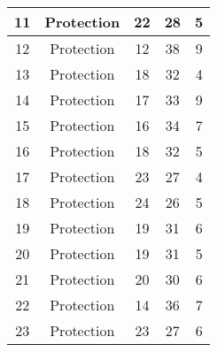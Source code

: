 \documentclass[results.tex]{subfiles}
\begin{document}
\begin{center}
\begin{tabular}{| c || c | c | c | c |}
            \hline
            11                      & Protection                   & 22                     & 28                      & 5                    \\
            \hline
            12                      & Protection                   & 12                     & 38                      & 9                    \\
            \hline
            13                      & Protection                   & 18                     & 32                      & 4                    \\
            \hline
            14                      & Protection                   & 17                     & 33                      & 9                    \\
            \hline
            15                      & Protection                   & 16                     & 34                      & 7                    \\
            \hline
            16                      & Protection                   & 18                     & 32                      & 5                    \\
            \hline
            17                      & Protection                   & 23                     & 27                      & 4                    \\
            \hline
            18                      & Protection                   & 24                     & 26                      & 5                    \\
            \hline
            19                      & Protection                   & 19                     & 31                      & 6                    \\
            \hline
            20                      & Protection                   & 19                     & 31                      & 5                    \\
            \hline
            21                      & Protection                   & 20                     & 30                      & 6                    \\
            \hline
            22                      & Protection                   & 14                     & 36                      & 7                    \\
            \hline
            23                      & Protection                   & 23                     & 27                      & 6                    \\

\end{tabular}
\end{center}
\end{document}

